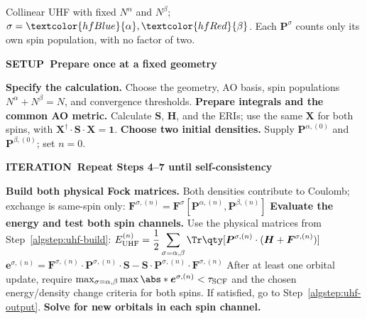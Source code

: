 \documentclass[11pt,a4paper,titlepage]{article}
\numberwithin{equation}{section}
\newcommand{\be}{\boldsymbol{e}}
\newcommand{\bF}{\boldsymbol{F}}
\newcommand{\bH}{\boldsymbol{H}}
\newcommand{\bI}{\boldsymbol{1}}
\newcommand{\bP}{\boldsymbol{P}}
\newcommand{\bS}{\boldsymbol{S}}
\newcommand{\bX}{\boldsymbol{X}}
\newcommand{\red}[1]{\textcolor{hfRed}{#1}}
\newcommand{\blue}[1]{\textcolor{hfBlue}{#1}}
\begin{document}
\begin{hfscfsummary}[title={Algorithm~\thetcbcounter\enspace\textbar\ The UHF self-consistent-field procedure},phantom={\label{alg:uhf-scf-summary}}]
\textcolor{hfInk}{Collinear UHF with fixed $N^\alpha$ and $N^\beta$;
$\sigma=\blue{\alpha},\red{\beta}$. Each $\bP^\sigma$ counts only its own
spin population, with no factor of two.}
\medskip
{}
\algrenewcommand{}
\begin{algorithmic}[1]
  \Statex \colorbox{hfGreenLight}{\strut\textcolor{hfGreenDark}{\bfseries
    SETUP\enspace\textbar\ Prepare once at a fixed geometry}}
  \State \textbf{Specify the calculation.}\label{algstep:uhf-input}
    Choose the geometry, AO basis, spin populations
    $N^\alpha+N^\beta=N$, and convergence thresholds.
  \State \textbf{Prepare integrals and the common AO metric.}\label{algstep:uhf-metric}
    Calculate $\bS$, $\bH$, and the ERIs; use the same $\bX$ for both spins,
    with $\bX^\dag\cdot\bS\cdot\bX=\bI$.
  \State \textbf{Choose two initial densities.}\label{algstep:uhf-guess}
    Supply $\bP^{\alpha,(0)}$ and $\bP^{\beta,(0)}$; set $n=0$.
  \Statex \smallskip
    \colorbox{hfBlue!7}{\strut\textcolor{hfBlue}{\bfseries
      ITERATION\enspace\textbar\ Repeat Steps 4--7 until self-consistency}}
  \State \textbf{Build both physical Fock matrices.}\label{algstep:uhf-build}
    Both densities contribute to Coulomb; exchange is same-spin only:
  \Statex $\displaystyle
    \bF^{\sigma,(n)}
      =\bF^\sigma[\bP^{\alpha,(n)},\bP^{\beta,(n)}]$
  \State \textbf{Evaluate the energy and test both spin channels.}\label{algstep:uhf-test}
    Use the physical matrices from Step~\ref{algstep:uhf-build}:
  \Statex $\displaystyle
    E_\text{UHF}^{(n)}=\frac12\sum_{\sigma=\alpha,\beta}
      \Tr\qty[\bP^{\sigma,(n)}\cdot(\bH+\bF^{\sigma,(n)})]$
  \Statex $\displaystyle
    \be^{\sigma,(n)}
      =\bF^{\sigma,(n)}\cdot\bP^{\sigma,(n)}\cdot\bS
      -\bS\cdot\bP^{\sigma,(n)}\cdot\bF^{\sigma,(n)}$
  \Statex After at least one orbital update, require
    $\max_{\sigma=\alpha,\beta}\max\abs*{\be^{\sigma,(n)}}<\tau_\text{SCF}$
    and the chosen energy/density change criteria for both spins.
    If satisfied, go to Step~\ref{algstep:uhf-output}.
  \State \textbf{Solve for new orbitals in each spin channel.}\label{algstep:uhf-solve}

\end{algorithmic}
\end{hfscfsummary}
\end{document}
